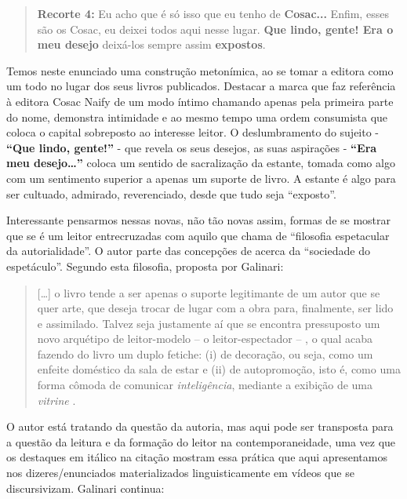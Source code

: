 \begin{quote}
\textbf{Recorte 4:}
Eu acho que é só isso que eu tenho de \textbf{Cosac...}
Enfim, esses são os Cosac, eu deixei todos aqui nesse lugar.
\textbf{Que lindo, gente! Era o meu desejo} deixá-los sempre
assim \textbf{expostos}.
\end{quote}

Temos neste enunciado uma construção metonímica, ao se tomar a editora
como um todo no lugar dos seus livros publicados. Destacar a marca que
faz referência à editora Cosac Naify de um modo íntimo chamando apenas
pela primeira parte do nome, demonstra intimidade e ao mesmo tempo uma
ordem consumista que coloca o capital sobreposto ao interesse leitor. O
deslumbramento do sujeito - \textbf{\enquote{Que lindo, gente!}} - que revela
os seus desejos, as suas aspirações - \textbf{\enquote{Era meu desejo\ldots}}
coloca um sentido de sacralização da estante, tomada como algo com um
sentimento superior a apenas um suporte de livro. A estante é algo para
ser cultuado, admirado, reverenciado, desde que tudo seja \enquote{exposto}.

Interessante pensarmos nessas novas, não tão novas assim, formas de se
mostrar que se é um leitor entrecruzadas com aquilo que \textcite{galinari2005autorialidade}
chama de \enquote{filosofia espetacular da autorialidade}. O autor parte das
concepções de \textcite{debord_sociedade_1997,subirats_cultura_1989} acerca da \enquote{sociedade do
espetáculo}. Segundo esta filosofia, proposta por Galinari:

\begin{quote}
[\ldots] o livro tende a ser apenas o suporte legitimante de um
autor que se quer arte, que deseja trocar de lugar com a obra para,
finalmente, ser lido e assimilado. Talvez seja justamente aí que se
encontra pressuposto um novo arquétipo de leitor-modelo -- o
leitor-espectador -- , o qual acaba fazendo do livro um duplo fetiche:
(i) de decoração, ou seja, como um enfeite doméstico da sala de estar e
(ii) de autopromoção, isto é, como uma forma cômoda de comunicar
\textit{inteligência}, mediante a exibição de uma \textit{vitrine}
\cite[p. 52–53]{galinari2005autorialidade}.
\end{quote}

O autor está tratando da questão da autoria, mas aqui pode ser
transposta para a questão da leitura e da formação do leitor na
contemporaneidade, uma vez que os destaques em itálico na citação
mostram essa prática que aqui apresentamos nos dizeres/enunciados
materializados linguisticamente em vídeos que se discursivizam. Galinari
continua:

